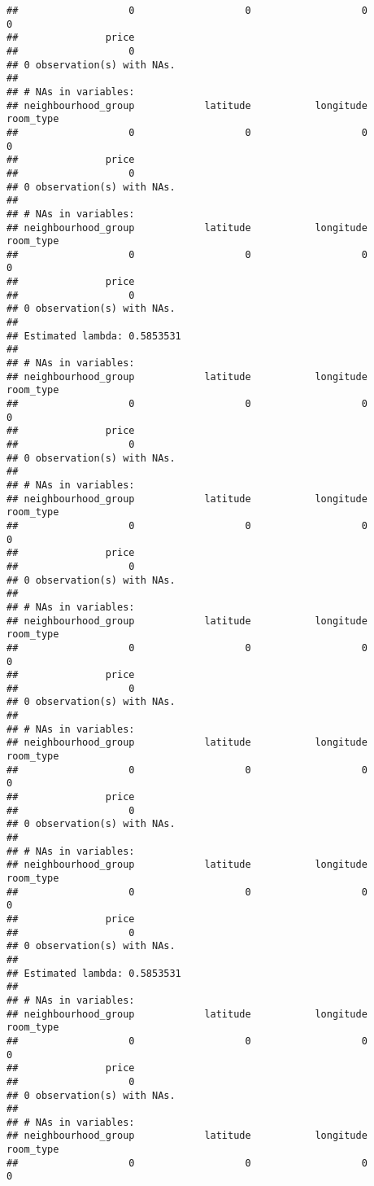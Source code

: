 \documentclass[
]{article}
\begin{document}
\begin{verbatim}
##                   0                   0                   0                   0 
##               price 
##                   0 
## 0 observation(s) with NAs.
## 
## # NAs in variables:
## neighbourhood_group            latitude           longitude           room_type 
##                   0                   0                   0                   0 
##               price 
##                   0 
## 0 observation(s) with NAs.
## 
## # NAs in variables:
## neighbourhood_group            latitude           longitude           room_type 
##                   0                   0                   0                   0 
##               price 
##                   0 
## 0 observation(s) with NAs.
## 
## Estimated lambda: 0.5853531 
## 
## # NAs in variables:
## neighbourhood_group            latitude           longitude           room_type 
##                   0                   0                   0                   0 
##               price 
##                   0 
## 0 observation(s) with NAs.
## 
## # NAs in variables:
## neighbourhood_group            latitude           longitude           room_type 
##                   0                   0                   0                   0 
##               price 
##                   0 
## 0 observation(s) with NAs.
## 
## # NAs in variables:
## neighbourhood_group            latitude           longitude           room_type 
##                   0                   0                   0                   0 
##               price 
##                   0 
## 0 observation(s) with NAs.
## 
## # NAs in variables:
## neighbourhood_group            latitude           longitude           room_type 
##                   0                   0                   0                   0 
##               price 
##                   0 
## 0 observation(s) with NAs.
## 
## # NAs in variables:
## neighbourhood_group            latitude           longitude           room_type 
##                   0                   0                   0                   0 
##               price 
##                   0 
## 0 observation(s) with NAs.
## 
## Estimated lambda: 0.5853531 
## 
## # NAs in variables:
## neighbourhood_group            latitude           longitude           room_type 
##                   0                   0                   0                   0 
##               price 
##                   0 
## 0 observation(s) with NAs.
## 
## # NAs in variables:
## neighbourhood_group            latitude           longitude           room_type 
##                   0                   0                   0                   0 

\end{verbatim}
\end{document}
